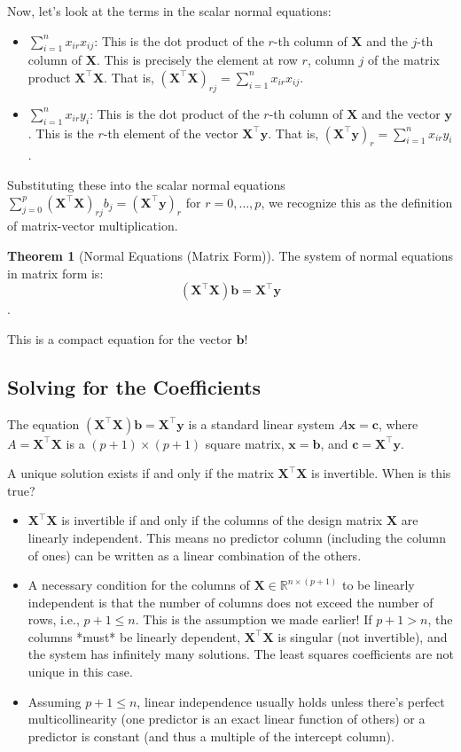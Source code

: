 \documentclass[11pt, letterpaper]{article}
\theoremstyle{definition}
\newtheorem{theorem}{Theorem}[section]
\newcommand{\R}{\mathbb{R}}
\newcommand{\mat}[1]{\mathbf{#1}} %
\newcommand{\vect}[1]{\mathbf{#1}} %
\begin{document}
Now, let's look at the terms in the scalar normal equations:
\begin{itemize}
    \item $\sum_{i=1}^{n} x_{ir} x_{ij}$: This is the dot product of the $r$-th column of $\mat{X}$ and the $j$-th column of $\mat{X}$. This is precisely the element at row $r$, column $j$ of the matrix product $\mat{X}^{\top}\mat{X}$. That is, $(\mat{X}^{\top}\mat{X})_{rj} = \sum_{i=1}^{n} x_{ir} x_{ij}$.
    \item $\sum_{i=1}^{n} x_{ir} y_i$: This is the dot product of the $r$-th column of $\mat{X}$ and the vector $\vect{y}$. This is the $r$-th element of the vector $\mat{X}^{\top}\vect{y}$. That is, $(\mat{X}^{\top}\vect{y})_r = \sum_{i=1}^{n} x_{ir} y_i$.
\end{itemize}
Substituting these into the scalar normal equations $\sum_{j=0}^{p} (\mat{X}^{\top}\mat{X})_{rj} b_j = (\mat{X}^{\top}\vect{y})_r$ for $r=0, \dots, p$, we recognize this as the definition of matrix-vector multiplication.

\begin{theorem}[Normal Equations (Matrix Form)]
The system of normal equations in matrix form is:
\[
(\mat{X}^{\top}\mat{X}) \vect{b} = \mat{X}^{\top}\vect{y}
\].
\end{theorem}

This is a compact equation for the vector $\vect{b}$!

\subsection{Solving for the Coefficients}

The equation $(\mat{X}^{\top}\mat{X}) \vect{b} = \mat{X}^{\top}\vect{y}$ is a standard linear system $A\vect{x} = \vect{c}$, where $A = \mat{X}^{\top}\mat{X}$ is a $(p+1) \times (p+1)$ square matrix, $\vect{x} = \vect{b}$, and $\vect{c} = \mat{X}^{\top}\vect{y}$.

A unique solution exists if and only if the matrix $\mat{X}^{\top}\mat{X}$ is invertible. When is this true?
\begin{itemize}
    \item $\mat{X}^{\top}\mat{X}$ is invertible if and only if the columns of the design matrix $\mat{X}$ are linearly independent. This means no predictor column (including the column of ones) can be written as a linear combination of the others.
    \item A necessary condition for the columns of $\mat{X} \in \R^{n \times (p+1)}$ to be linearly independent is that the number of columns does not exceed the number of rows, i.e., $p+1 \le n$. This is the assumption we made earlier! If $p+1 > n$, the columns *must* be linearly dependent, $\mat{X}^{\top}\mat{X}$ is singular (not invertible), and the system has infinitely many solutions. The least squares coefficients are not unique in this case.
    \item Assuming $p+1 \le n$, linear independence usually holds unless there's perfect multicollinearity (one predictor is an exact linear function of others) or a predictor is constant (and thus a multiple of the intercept column).
\end{itemize}
\end{document}

